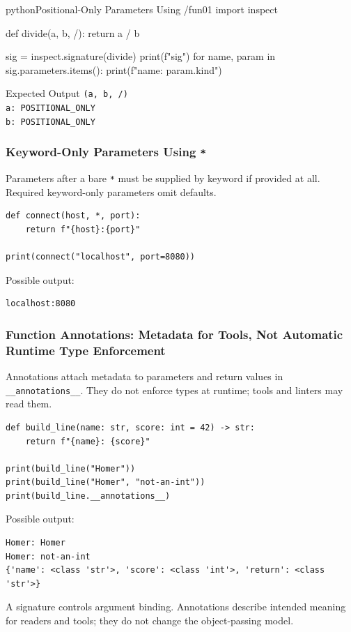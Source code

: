 \begin{codebox}[]{python}{Positional-Only Parameters Using /}{fun01}
import inspect

def divide(a, b, /):
    return a / b

sig = inspect.signature(divide)
print(f"{sig}")
for name, param in sig.parameters.items():
    print(f"{name}: {param.kind}")
\end{codebox}


\begin{iobox}{Expected Output}
\texttt{(a, b, /)} \\
\texttt{a: POSITIONAL\_ONLY} \\
\texttt{b: POSITIONAL\_ONLY} \\
\end{iobox}




\subsubsection{Keyword-Only Parameters Using \texttt{*}}

Parameters after a bare \texttt{*} must be supplied by keyword if provided at all. Required keyword-only parameters omit defaults.

\begin{verbatim}
def connect(host, *, port):
    return f"{host}:{port}"

print(connect("localhost", port=8080))
\end{verbatim}

Possible output:

\begin{verbatim}
localhost:8080
\end{verbatim}

\subsubsection{Function Annotations: Metadata for Tools, Not Automatic Runtime Type Enforcement}

Annotations attach metadata to parameters and return values in \texttt{\_\_annotations\_\_}. They do not enforce types at runtime; tools and linters may read them.

\begin{verbatim}
def build_line(name: str, score: int = 42) -> str:
    return f"{name}: {score}"

print(build_line("Homer"))
print(build_line("Homer", "not-an-int"))
print(build_line.__annotations__)
\end{verbatim}

Possible output:

\begin{verbatim}
Homer: Homer
Homer: not-an-int
{'name': <class 'str'>, 'score': <class 'int'>, 'return': <class 'str'>}
\end{verbatim}

A signature controls argument binding. Annotations describe intended meaning for readers and tools; they do not change the object-passing model.
